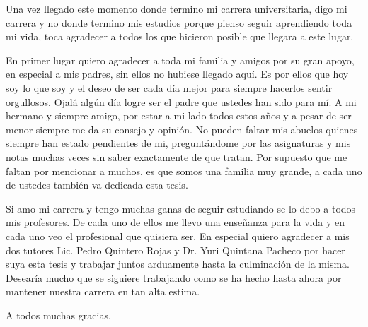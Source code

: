 \begin{acknowledgements}

Una vez llegado este momento donde termino mi carrera universitaria, digo mi carrera y no donde termino mis estudios porque pienso seguir aprendiendo toda mi vida, toca agradecer a todos los que hicieron posible que llegara a este lugar.

En primer lugar quiero agradecer a toda mi familia y amigos por su gran apoyo, en especial a mis padres, sin ellos no hubiese llegado aqu\'i. Es por ellos que hoy soy lo que soy y el deseo de ser cada d\'ia mejor para siempre hacerlos sentir orgullosos. Ojal\'a alg\'un d\'ia logre ser el padre que ustedes han sido para m\'i. A mi hermano y siempre amigo, por estar a mi lado todos estos a\~nos y a pesar de ser menor siempre me da su consejo y opini\'on. No pueden faltar mis abuelos quienes siempre han estado pendientes de mi, pregunt\'andome por las asignaturas y mis notas muchas veces sin saber exactamente de que tratan. Por supuesto que me faltan por mencionar a muchos, es que somos una familia muy grande, a cada uno de ustedes tambi\'en va dedicada esta tesis.

Si amo mi carrera y tengo muchas ganas de seguir estudiando se lo debo a todos mis profesores. De cada uno de ellos me llevo una ense\~nanza para la vida y en cada uno veo el profesional que quisiera ser. En especial quiero agradecer a mis dos tutores Lic. Pedro Quintero Rojas y Dr. Yuri Quintana Pacheco por hacer suya esta tesis y trabajar juntos arduamente hasta la culminaci\'on de la misma. Desear\'ia mucho que se siguiere trabajando como se ha hecho hasta ahora por mantener nuestra carrera en tan alta estima.

A todos muchas gracias.

\end{acknowledgements}